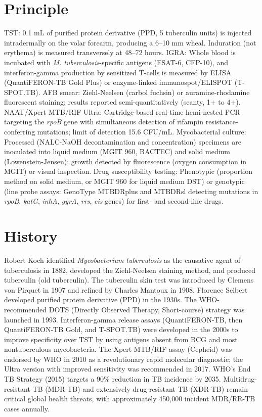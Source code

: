 \section*{Principle}
TST: 0.1 mL of purified protein derivative (PPD, 5 tuberculin units) is injected intradermally on the volar forearm, producing a 6--10 mm wheal. Induration (not erythema) is measured transversely at 48--72 hours. IGRA: Whole blood is incubated with \textit{M. tuberculosis}-specific antigens (ESAT-6, CFP-10), and interferon-gamma production by sensitized T-cells is measured by ELISA (QuantiFERON-TB Gold Plus) or enzyme-linked immunospot/ELISPOT (T-SPOT.TB). AFB smear: Ziehl-Neelsen (carbol fuchsin) or auramine-rhodamine fluorescent staining; results reported semi-quantitatively (scanty, 1+ to 4+). NAAT/Xpert MTB/RIF Ultra: Cartridge-based real-time hemi-nested PCR targeting the \textit{rpoB} gene with simultaneous detection of rifampin resistance-conferring mutations; limit of detection 15.6 CFU/mL. Mycobacterial culture: Processed (NALC-NaOH decontamination and concentration) specimens are inoculated into liquid medium (MGIT 960, BACTEC) and solid medium (Lowenstein-Jensen); growth detected by fluorescence (oxygen consumption in MGIT) or visual inspection. Drug susceptibility testing: Phenotypic (proportion method on solid medium, or MGIT 960 for liquid medium DST) or genotypic (line probe assays: GenoType MTBDRplus and MTBDRsl detecting mutations in \textit{rpoB}, \textit{katG}, \textit{inhA}, \textit{gyrA}, \textit{rrs}, \textit{eis} genes) for first- and second-line drugs.

\section*{History}
Robert Koch identified \textit{Mycobacterium tuberculosis} as the causative agent of tuberculosis in 1882, developed the Ziehl-Neelsen staining method, and produced tuberculin (old tuberculin). The tuberculin skin test was introduced by Clemens von Pirquet in 1907 and refined by Charles Mantoux in 1908. Florence Seibert developed purified protein derivative (PPD) in the 1930s. The WHO-recommended DOTS (Directly Observed Therapy, Short-course) strategy was launched in 1993. Interferon-gamma release assays (QuantiFERON-TB, then QuantiFERON-TB Gold, and T-SPOT.TB) were developed in the 2000s to improve specificity over TST by using antigens absent from BCG and most nontuberculous mycobacteria. The Xpert MTB/RIF assay (Cepheid) was endorsed by WHO in 2010 as a revolutionary rapid molecular diagnostic; the Ultra version with improved sensitivity was recommended in 2017. WHO's End TB Strategy (2015) targets a 90\% reduction in TB incidence by 2035. Multidrug-resistant TB (MDR-TB) and extensively drug-resistant TB (XDR-TB) remain critical global health threats, with approximately 450,000 incident MDR/RR-TB cases annually.

